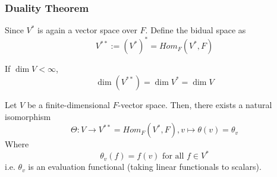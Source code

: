 \subsubsection{Duality Theorem}

\begin{definition}
    Since $V^*$ is again a vector space over $F$. Define the bidual space as 
    \[
        V^{**} := (V^*)^* = Hom_F (V^*, F)
    \]
\end{definition}

\begin{remark}      
    If $\dim V < \infty$, 
    \[
        \dim (V^{**}) = \dim V^* = \dim V
    \]
\end{remark}        

\begin{theorem}
    Let $V$ be a finite-dimensional $F$-vector space. Then, there exists a natural isomorphism 
    \[
        \Theta: V \to V^{**} = Hom_F(V^*, F), v \mapsto \theta(v) = \theta_v
    \]
    Where 
    \[
        \theta_v(f) = f(v) \text{ for all } f \in V^*
    \]
    i.e. $\theta_v$ is an evaluation functional (taking linear functionals to scalars).
\end{theorem}

















